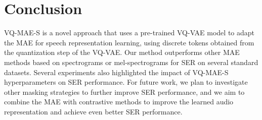 \documentclass{article}
\begin{document}
\section{Conclusion}
\label{sec:conclusion}
VQ-MAE-S is a novel approach that uses a pre-trained VQ-VAE model to adapt the MAE for speech representation learning, using discrete tokens obtained from the quantization step of the VQ-VAE. Our method outperforms other MAE methods based on spectrograms or mel-spectrograms for SER on several standard datasets. Several experiments also highlighted the impact of VQ-MAE-S hyperparameters on SER performance. For future work, we plan to investigate other masking strategies to further improve SER performance, and we aim to combine the MAE with contrastive methods to improve the learned audio representation and achieve even better SER performance.
\clearpage











\end{document}
